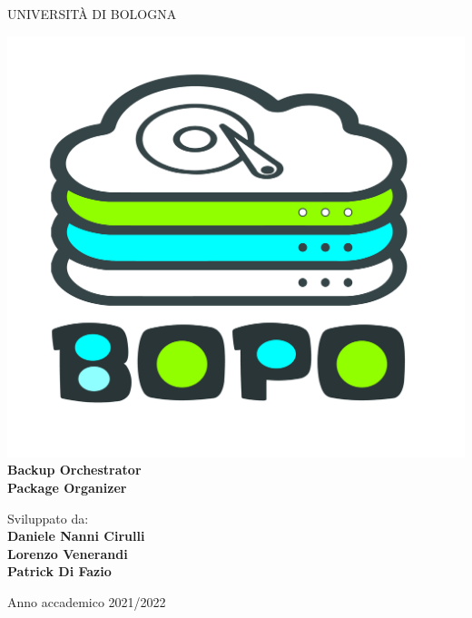 \documentclass[a4paper,11pt,oneside]{book}
\begin{document}
\thispagestyle{empty}
\vspace{2cm}

\begin{center}                                                            
    \vspace{5mm}
    {\LARGE UNIVERSIT\`A DI BOLOGNA} \\                       
      \vspace{2cm}
\end{center}
\begin{center}
  \includegraphics[scale=0.1]{figs/bopo.png}
  \vspace{1 cm}
\LARGE\textbf{\\Backup Orchestrator \\Package Organizer} \\                       
\end{center}

\begin{flushleft}
    \vspace{3cm}
      {\Large{Sviluppato da:}}\\
      \vspace{3mm}
      \textbf{\@ Daniele Nanni Cirulli}\\
      \vspace{1mm}
      \textbf{\@ Lorenzo Venerandi}\\
      \vspace{1mm}
      \textbf{\@ Patrick Di Fazio}\\
\end{flushleft}        %
\begin{center}
\vfill
      {\large Anno accademico \@2021/2022} \\
\end{center}
\end{document}
